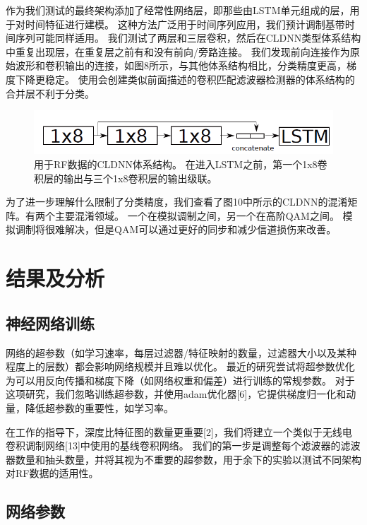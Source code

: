 作为我们测试的最终架构添加了经常性网络层，即那些由LSTM单元组成的层，用于对时间特征进行建模。 这种方法广泛用于时间序列应用，我们预计调制基带时间序列可能同样适用。 我们测试了两层和三层卷积，然后在CLDNN类型体系结构中重复出现层，在重复层之前有和没有前向/旁路连接。 我们发现前向连接作为原始波形和卷积输出的连接，如图8所示，与其他体系结构相比，分类精度更高，梯度下降更稳定。 使用会创建类似前面描述的卷积匹配滤波器检测器的体系结构的合并层不利于分类。\par
\begin{figure}[!h]
	\centering
	\includegraphics[scale=1]{figures/chapter_5/fig6}
	\caption{用于RF数据的CLDNN体系结构。 在进入LSTM之前，第一个1x8卷积层的输出与三个1x8卷积层的输出级联。}
\end{figure}

为了进一步理解什么限制了分类精度，我们查看了图10中所示的CLDNN的混淆矩阵。有两个主要混淆领域。 一个在模拟调制之间，另一个在高阶QAM之间。 模拟调制将很难解决，但是QAM可以通过更好的同步和减少信道损伤来改善。\par
\section{结果及分析}

\subsection{神经网络训练}

网络的超参数（如学习速率，每层过滤器/特征映射的数量，过滤器大小以及某种程度上的层数）都会影响网络规模并且难以优化。 最近的研究尝试将超参数优化为可以用反向传播和梯度下降（如网络权重和偏差）进行训练的常规参数。 对于这项研究，我们忽略训练超参数，并使用adam优化器[6]，它提供梯度归一化和动量，降低超参数的重要性，如学习率。

在工作的指导下，深度比特征图的数量更重要[2]，我们将建立一个类似于无线电卷积调制网络[13]中使用的基线卷积网络。 我们的第一步是调整每个滤波器的滤波器数量和抽头数量，并将其视为不重要的超参数，用于余下的实验以测试不同架构对RF数据的适用性。


\subsection{网络参数}


